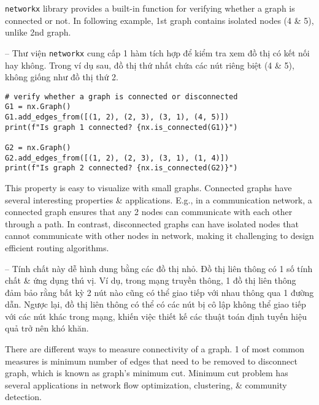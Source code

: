 \documentclass{article}
\begin{document}
\begin{itemize}
\begin{itemize}
        {\tt networkx} library provides a built-in function for verifying whether a graph is connected or not. In following example, 1st graph contains isolated nodes (4 \& 5), unlike 2nd graph.

        -- Thư viện {\tt networkx} cung cấp 1 hàm tích hợp để kiểm tra xem đồ thị có kết nối hay không. Trong ví dụ sau, đồ thị thứ nhất chứa các nút riêng biệt (4 \& 5), không giống như đồ thị thứ 2.
        \begin{verbatim}
# verify whether a graph is connected or disconnected
G1 = nx.Graph()
G1.add_edges_from([(1, 2), (2, 3), (3, 1), (4, 5)])
print(f"Is graph 1 connected? {nx.is_connected(G1)}")

G2 = nx.Graph()
G2.add_edges_from([(1, 2), (2, 3), (3, 1), (1, 4)])
print(f"Is graph 2 connected? {nx.is_connected(G2)}")
        \end{verbatim}
        This property is easy to visualize with small graphs. Connected graphs have several interesting properties \& applications. E.g., in a communication network, a connected graph ensures that any 2 nodes can communicate with each other through a path. In contrast, disconnected graphs can have isolated nodes that cannot communicate with other nodes in network, making it challenging to design efficient routing algorithms.

        -- Tính chất này dễ hình dung bằng các đồ thị nhỏ. Đồ thị liên thông có 1 số tính chất \& ứng dụng thú vị. Ví dụ, trong mạng truyền thông, 1 đồ thị liên thông đảm bảo rằng bất kỳ 2 nút nào cũng có thể giao tiếp với nhau thông qua 1 đường dẫn. Ngược lại, đồ thị liên thông có thể có các nút bị cô lập không thể giao tiếp với các nút khác trong mạng, khiến việc thiết kế các thuật toán định tuyến hiệu quả trở nên khó khăn.

        There are different ways to measure connectivity of a graph. 1 of most common measures is minimum number of edges that need to be removed to disconnect graph, which is known as graph's minimum cut. Minimum cut problem has several applications in network flow optimization, clustering, \& community detection.


\end{itemize}
\end{itemize}
\end{document}
